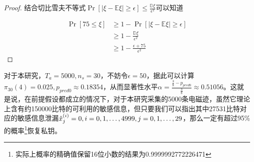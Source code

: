 {\begin{proof}
	结合切比雪夫不等式$\Pr\left[\vert \xi-\mathbb E\xi\vert\ge\epsilon\right]\le \frac{\mathbb D\xi}{\epsilon^2}$可以知道
	
	\begin{align*}
		\Pr\left[75\le\xi\right]&\ge1-\Pr\left[\vert \xi-\mathbb E\xi\vert\ge\epsilon\right]\\
		&\ge 1-\frac{\mathbb D\xi}{\epsilon^2}\\
		&\ge1-\frac{\epsilon+75}{\epsilon^2}
	\end{align*}

	\end{proof}
	对于本研究，$T_a=5000,n_s=30$，不妨令$\epsilon=50$，据此可以计算$\pi_{30}(4)=0.025,p_{pred0}\approx0.18354$，从而显著性水平$\alpha=\frac{\frac38-p_{pred0}}{\frac38}\approx0.51056$。这就是说，在前提假设都成立的情况下，对于本研究采集的5000条电磁迹，虽然它理论上含有约150000比特的可利用的敏感信息，但只要我们可以指出其中27531比特对应的敏感信息泄漏$\hat{x}^{(i)}_j=0,i=0,1,\dots,4999,j=0,1,\dots,29$，那么一定有超过95\%的概率\footnote{实际上概率的精确值保留16位小数的结果为0.9999992772226471}恢复私钥。
		

%


}

